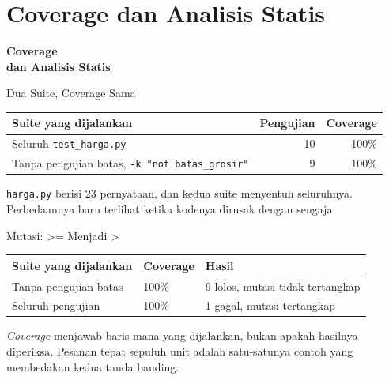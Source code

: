 \documentclass[aspectratio=169, table, 12pt]{beamer}
\begin{document}
\section{Coverage dan Analisis Statis}

\begin{frame}{\hfill}
  \centering
  \Huge{\textbf{Coverage\\dan Analisis Statis}}
\end{frame}

\begin{frame}{{\Large Dua Suite, Coverage Sama}}
  \vspace{6pt}
  \centering
  {\footnotesize
  \begin{tabularx}{\textwidth}{Yrr}
    \hline
    \textbf{Suite yang dijalankan} & \textbf{Pengujian} & \textbf{Coverage} \\
    \hline
    Seluruh \texttt{test\_harga.py} & 10 & 100\% \\
    \hline
    Tanpa pengujian batas, \texttt{-k "not batas\_grosir"} & 9 & 100\% \\
    \hline
  \end{tabularx}}

  \vspace{8pt}
  {\small \texttt{harga.py} berisi 23 pernyataan, dan kedua suite
  menyentuh seluruhnya. Perbedaannya baru terlihat ketika kodenya dirusak
  dengan sengaja.}
\end{frame}

\begin{frame}{{\Large Mutasi: >= Menjadi >}}
  \vspace{6pt}
  \centering
  {\footnotesize
  \begin{tabularx}{\textwidth}{Yll}
    \hline
    \textbf{Suite yang dijalankan} & \textbf{Coverage} & \textbf{Hasil} \\
    \hline
    Tanpa pengujian batas & 100\% & 9 lolos, mutasi tidak tertangkap \\
    \hline
    Seluruh pengujian & 100\% & 1 gagal, mutasi tertangkap \\
    \hline
  \end{tabularx}}

  \vspace{8pt}
  {\small \textit{Coverage} menjawab baris mana yang dijalankan, bukan apakah
  hasilnya diperiksa. Pesanan tepat sepuluh unit adalah satu-satunya contoh
  yang membedakan kedua tanda banding.}
\end{frame}
\end{document}
